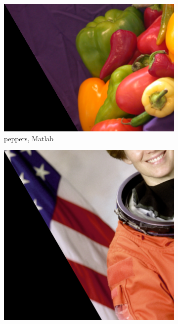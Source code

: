 \documentclass{article}
\begin{document}
\begin{figure}[!ht]
    \centering
    \begin{subfigure}{0.356\textwidth}
        \includegraphics[width=\textwidth]{./fig/similarity_peppers.png}
        \caption{peppers, Matlab}
    \end{subfigure}
    \begin{subfigure}{0.267\textwidth}
        \includegraphics[width=\textwidth]{./fig/similarity_astronaut.png}

\end{subfigure}
\end{figure}
\end{document}
